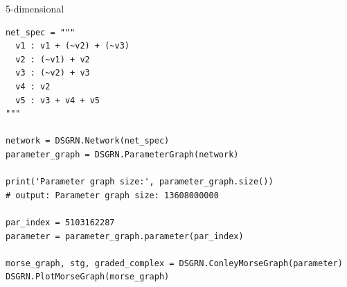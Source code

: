 5-dimensional

\begin{verbatim}
net_spec = """
  v1 : v1 + (~v2) + (~v3)
  v2 : (~v1) + v2
  v3 : (~v2) + v3
  v4 : v2
  v5 : v3 + v4 + v5
"""

network = DSGRN.Network(net_spec)
parameter_graph = DSGRN.ParameterGraph(network)

print('Parameter graph size:', parameter_graph.size())
# output: Parameter graph size: 13608000000

par_index = 5103162287
parameter = parameter_graph.parameter(par_index)

morse_graph, stg, graded_complex = DSGRN.ConleyMorseGraph(parameter)
DSGRN.PlotMorseGraph(morse_graph)
\end{verbatim}